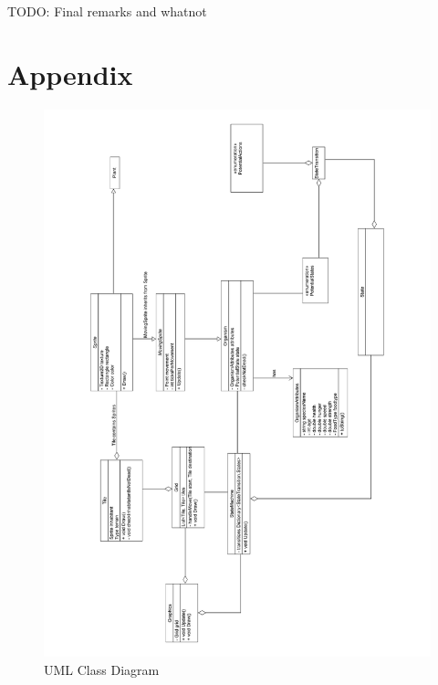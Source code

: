 \documentclass{ueacmpstyle}
\begin{document}
TODO: Final remarks and whatnot

\section{Appendix}

\begin{figure}[H]
	\caption{UML Class Diagram}\label{classdiagram}
	\includegraphics[width=\textwidth,height=\textheight]{class-diagram}
\end{figure}



	
\end{document}
